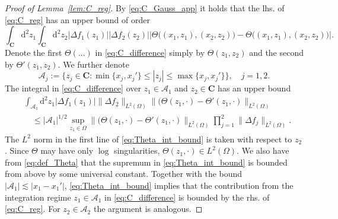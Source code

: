 \documentclass[10pt]{amsart}
\numberwithin{equation}{section}
\newcommand{\dif}{\mathrm{d}}
\newcommand{\C}{\mathbf{C}}
\begin{document}
\begin{proof}[Proof of Lemma~\ref{lem:C_reg}] By \eqref{eq:C_Gauss_app} it holds that the lhs. of \eqref{eq:C_reg} has an upper bound of order
\begin{equation}
\int_\C\dif^2 z_1\int_\C \dif^2 z_2 |\Delta f_1(z_1)||\Delta f_2(z_2)| \left\vert \Theta\big((x_1,z_1),(x_2,z_2)\big)-\Theta\big((x_1,z_1),(x_2,z_2)\big)\right\vert.
\label{eq:C_difference}
\end{equation}
Denote the first $\Theta(...)$ in \eqref{eq:C_difference} simply by $\Theta(z_1,z_2)$ and the second by $\Theta'(z_1,z_2)$. We further denote
\begin{equation}
\mathcal{A}_j:=\big\lbrace z_j\in \C: \min\{x_j,x_j'\}\le |z_j|\le \max\{x_j,x_j'\}\big\rbrace,\quad j=1,2.
\end{equation}
The integral in \eqref{eq:C_difference} over $z_1\in \mathcal{A}_1$ and $z_2\in\C$ has an upper bound
\begin{equation}
\begin{split}
&\int_{\mathcal{A}_1}\dif^2 z_1|\Delta f_1(z_1)| \|\Delta f_2\|_{L^2(\Omega)} \|(\Theta(z_1,\cdot)-\Theta'(z_1,\cdot)\|_{L^2(\Omega)}\\
&\quad \le |\mathcal{A}_1|^{1/2} \sup_{z_1\in \Omega}\|(\Theta(z_1,\cdot)-\Theta'(z_1,\cdot)\|_{L^2(\Omega)}\prod_{j=1}^2 \|\Delta f_j\|_{L^2(\Omega)}.
\end{split}
\label{eq:Theta_int_bound}
\end{equation}
The $L^2$ norm in the first line of \eqref{eq:Theta_int_bound} is taken with respect to $z_2$. 
Since $\Theta$ may have only $\log$ singularities, $\Theta(z_1,\cdot)\in L^2(\Omega)$. We also have from \eqref{eq:def_Theta} that the supremum in \eqref{eq:Theta_int_bound} is bounded from above by some universal constant. Together with the bound $|\mathcal{A}_1|\lesssim |x_1-x_1'|$, \eqref{eq:Theta_int_bound} implies that the contribution from the integration regime $z_1\in\mathcal{A}_1$ in \eqref{eq:C_difference} is bounded by the rhs. of \eqref{eq:C_reg}. For $z_2\in\mathcal{A}_2$ the argument is analogous.


\end{proof}
\end{document}
